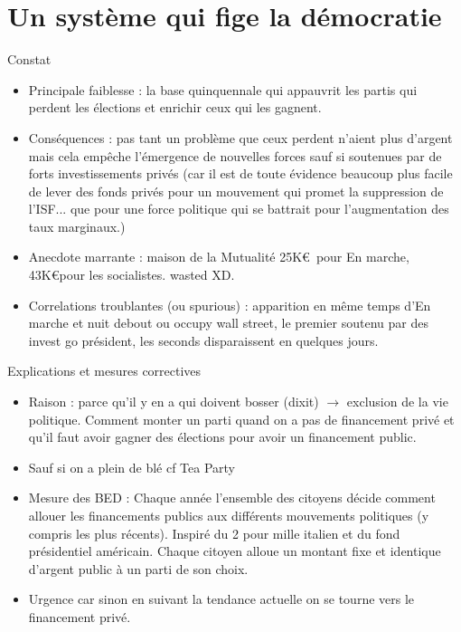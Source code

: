 \documentclass[10pt,t]{beamer}
\begin{document}
\section{Un système qui fige la démocratie}
\begin{frame}{Constat}
    \begin{itemize}
        \item \alert{Principale faiblesse} : la base quinquennale qui appauvrit les partis qui perdent les élections et enrichir ceux qui les gagnent.
        \item \alert{Conséquences} : pas tant un problème que ceux perdent n'aient plus d'argent mais cela empêche l'émergence de nouvelles forces sauf si soutenues par de forts investissements privés (car il est de toute évidence beaucoup plus facile de lever des fonds privés pour un mouvement qui promet la suppression de l'ISF... que pour une force politique qui se battrait pour l'augmentation des taux marginaux.)
        \item \alert{Anecdote marrante} : maison de la Mutualité 25K\euro\ pour En marche, 43K\euro pour les socialistes. wasted XD.
        \item \alert{Correlations troublantes (ou spurious)} : apparition en même temps d'En marche et nuit debout ou occupy wall street, le premier soutenu par des invest go président, les seconds disparaissent en quelques jours.
    \end{itemize}
\end{frame}
\begin{frame}{Explications et mesures correctives}
    \begin{itemize}
        \item \alert{Raison} : parce qu'il y en a qui doivent bosser (dixit) $\rightarrow$ exclusion de la vie politique. Comment monter un parti quand on a pas de financement privé et qu'il faut avoir gagner des élections pour avoir un financement public.
        \item Sauf si on a plein de blé cf Tea Party
        \item \alert{Mesure des BED} : Chaque année l'ensemble des citoyens décide comment allouer les financements publics aux différents mouvements politiques (y compris les plus récents). Inspiré du 2 pour mille italien et du fond présidentiel américain. Chaque citoyen alloue un montant fixe et identique d'argent public à un parti de son choix.
        \item \alert{Urgence} car sinon en suivant la tendance actuelle on se tourne vers le financement privé.
    \end{itemize}
\end{frame}
\end{document}
